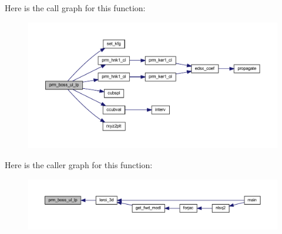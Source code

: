 Here is the call graph for this function\+:\nopagebreak
\begin{figure}[H]
\begin{center}
\leavevmode
\includegraphics[width=350pt]{Leroi_8f90_a8fe568053ec398fc50ab206827a43d81_cgraph}
\end{center}
\end{figure}
Here is the caller graph for this function\+:\nopagebreak
\begin{figure}[H]
\begin{center}
\leavevmode
\includegraphics[width=350pt]{Leroi_8f90_a8fe568053ec398fc50ab206827a43d81_icgraph}
\end{center}
\end{figure}
\mbox{\label{Leroi_8f90_ab6689c64fba851d3db437dbd7fc0d13a}} 
